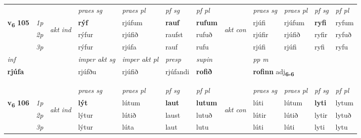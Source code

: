 \begin{longtable}[l]{X>{\footnotesize\itshape}llXXXXlXXXX}
\midrule

 & &   & \textit{praes sg}  & \textit{praes pl}    & \textit{ pf sg} & \textit{pf pl} & & \textit{praes sg}  & \textit{praes pl}    & \textit{pf sg} & \textit{pf pl }  \\ \cmidrule{4-7} \cmidrule{9-12}
 \multirow{2}{*}{{{\textbf{v{\textsubscript{6}}} \Large{\textbf{105}}}}}  & 1p & \multirow{3}{*}{\begin{turn}{90}\textit{akt ind}\end{turn}} & \textbf{rýf} & rjúfum & \textbf{rauf} & \textbf{rufum} & \multirow{3}{*}{\begin{turn}{90}\textit{akt con}\end{turn}} &rjúfi & rjúfum & \textbf{ryfi} & ryfum\\*
 & 2p &  &  rýfur  & rjúfið & raufst & rufuð & & rjúfir & rjúfið & ryfir & ryfuð \\*
 & 3p &  & rýfur & rjúfa & rauf & rufu & & rjúfi & rjúfi& ryfi & ryfu \\*
\cmidrule{4-7} \cmidrule{9-12}

   {\textit{inf}} & &  & \textit{imper akt sg} & \textit{imper akt pl}   & \textit{presp} & \textit{supin}  && \textit{pp m} \\*
  {\textbf{rjúfa}} & && rjúfðu  & rjúfið   & rjúfandi &  \textbf{rofið}  && \multicolumn{2}{l}{\textbf{rofinn} adj\textbf{\textsubscript{6-6}}} \\*

\midrule

   & \\*
  & \\
   \midrule
 & &   & \textit{praes sg}  & \textit{praes pl}    & \textit{ pf sg} & \textit{pf pl} & & \textit{praes sg}  & \textit{praes pl}    & \textit{pf sg} & \textit{pf pl }  \\ \cmidrule{4-7} \cmidrule{9-12}
 \multirow{2}{*}{{{\textbf{v{\textsubscript{6}}} \Large{\textbf{106}}}}}  & 1p & \multirow{3}{*}{\begin{turn}{90}\textit{akt ind}\end{turn}} & \textbf{lýt} & lútum & \textbf{laut} & \textbf{lutum} & \multirow{3}{*}{\begin{turn}{90}\textit{akt con}\end{turn}} &lúti & lútum & \textbf{lyti} & lytum\\*
 & 2p &  &  lýtur  & lútið & laust & lutuð & & lútir & lútið & lytir & lytuð \\*
 & 3p &  & lýtur & lúta & laut & lutu & & lúti & lúti& lyti & lytu \\*
\cmidrule{4-7} \cmidrule{9-12}


\end{longtable}
